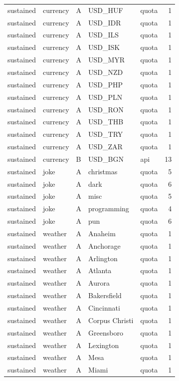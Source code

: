 \begin{tabular}{lllllr}
sustained & currency & A & USD_HUF & quota & 1 \\
sustained & currency & A & USD_IDR & quota & 1 \\
sustained & currency & A & USD_ILS & quota & 1 \\
sustained & currency & A & USD_ISK & quota & 1 \\
sustained & currency & A & USD_MYR & quota & 1 \\
sustained & currency & A & USD_NZD & quota & 1 \\
sustained & currency & A & USD_PHP & quota & 1 \\
sustained & currency & A & USD_PLN & quota & 1 \\
sustained & currency & A & USD_RON & quota & 1 \\
sustained & currency & A & USD_THB & quota & 1 \\
sustained & currency & A & USD_TRY & quota & 1 \\
sustained & currency & A & USD_ZAR & quota & 1 \\
sustained & currency & B & USD_BGN & api & 13 \\
sustained & joke & A & christmas & quota & 5 \\
sustained & joke & A & dark & quota & 6 \\
sustained & joke & A & misc & quota & 5 \\
sustained & joke & A & programming & quota & 4 \\
sustained & joke & A & pun & quota & 6 \\
sustained & weather & A & Anaheim & quota & 1 \\
sustained & weather & A & Anchorage & quota & 1 \\
sustained & weather & A & Arlington & quota & 1 \\
sustained & weather & A & Atlanta & quota & 1 \\
sustained & weather & A & Aurora & quota & 1 \\
sustained & weather & A & Bakersfield & quota & 1 \\
sustained & weather & A & Cincinnati & quota & 1 \\
sustained & weather & A & Corpus Christi & quota & 1 \\
sustained & weather & A & Greensboro & quota & 1 \\
sustained & weather & A & Lexington & quota & 1 \\
sustained & weather & A & Mesa & quota & 1 \\
sustained & weather & A & Miami & quota & 1 \\

\end{tabular}
